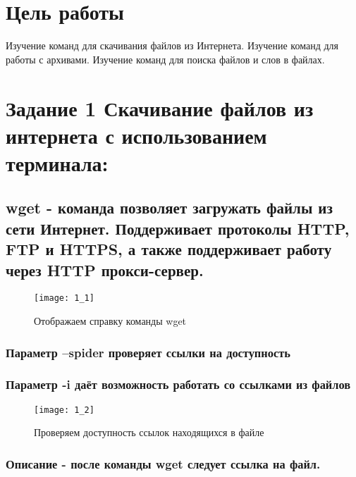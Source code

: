 







\section{Цель работы}
Изучение команд для скачивания файлов из Интернета. Изучение команд для работы с архивами. Изучение команд для поиска файлов и слов в файлах.

\section{Задание 1 Скачивание файлов из интернета с использованием терминала:}

\subsection{wget - команда позволяет загружать файлы из сети Интернет. Поддерживает протоколы HTTP, FTP и HTTPS, а также поддерживает работу через HTTP прокси-сервер.}

\begin{figure}[H]
	\begin{center}
		\texttt{[image: 1\_1]}
		\caption{Отображаем справку команды wget} 
		\label{pic:pic_1} %
	\end{center}
\end{figure}

\subsubsection{Параметр --spider проверяет ссылки на доступность}
\subsubsection{Параметр -i даёт возможность работать со ссылками из файлов}

\begin{figure}[H]
	\begin{center}
		\texttt{[image: 1\_2]}
		\caption{Проверяем доступность ссылок находящихся в файле} 
		\label{pic:pic_1} %
	\end{center}
\end{figure}

\subsubsection{Описание - после команды wget следует ссылка на файл.}

